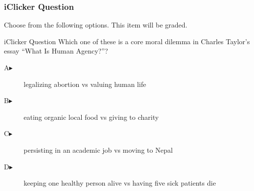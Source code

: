 \begin{frame}
  \frametitle{iClicker Question}
Choose from the following options. This item will be graded.
\begin{block}{iClicker Question}
Which one of these is a core moral dilemma in Charles Taylor's essay
``What Is Human Agency?''?
\end{block}
\begin{description}
\item[A\hspace{.2in}$\blacktriangleright$] legalizing abortion vs valuing human life
\item[B\hspace{.2in}$\blacktriangleright$] eating organic local food vs giving to charity
\item[C\hspace{.2in}$\blacktriangleright$] persisting in an academic job vs moving to Nepal
\item[D\hspace{.2in}$\blacktriangleright$] keeping one healthy person alive vs having five sick patients die
\end{description}
\end{frame}
